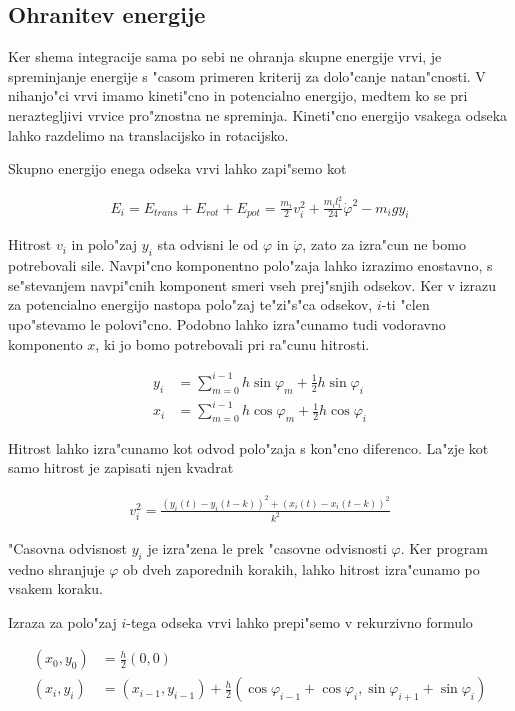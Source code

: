 \documentclass[a4paper,10pt]{article}
\renewcommand{\phi}{\varphi}
\begin{document}
\subsection{Ohranitev energije}

Ker shema integracije sama po sebi ne ohranja skupne energije vrvi, je spreminjanje energije s "casom primeren kriterij za dolo"canje natan"cnosti. V nihanjo"ci vrvi imamo kineti"cno in potencialno energijo, medtem ko se pri neraztegljivi vrvice pro"znostna ne spreminja. Kineti"cno energijo vsakega odseka lahko razdelimo na translacijsko in rotacijsko. 

Skupno energijo enega odseka vrvi lahko zapi"semo kot

\begin{align}
 E_i = E_{trans} + E_{rot} + E_{pot} = \frac{m_i}{2} v_i^2 + \frac{m_i l_i^2}{24} \dot{\phi}^2- m_i g y_i
\end{align}

Hitrost $v_i$ in polo"zaj $y_i$ sta odvisni le od $\phi$ in $\dot\phi$, zato za izra"cun ne bomo potrebovali sile. Navpi"cno komponentno polo"zaja lahko izrazimo enostavno, s se"stevanjem navpi"cnih komponent smeri vseh prej"snjih odsekov. Ker v izrazu za potencialno energijo nastopa polo"zaj te"zi"s"ca odsekov, $i$-ti "clen upo"stevamo le polovi"cno. Podobno lahko izra"cunamo tudi vodoravno komponento $x$, ki jo bomo potrebovali pri ra"cunu hitrosti. 

\begin{align}
 y_i &= \sum_{m=0}^{i-1} h \sin \phi_m + \frac{1}{2}h\sin\phi_i \\
 x_i &= \sum_{m=0}^{i-1} h \cos \phi_m + \frac{1}{2}h\cos\phi_i
\end{align}

Hitrost lahko izra"cunamo kot odvod polo"zaja s kon"cno diferenco. La"zje kot samo hitrost je zapisati njen kvadrat

\begin{align}
 v_i^2 = \frac{\left(y_i(t) - y_i(t-k)\right)^2 + \left(x_i(t) - x_i(t-k)\right)^2}{k^2}
\end{align}

"Casovna odvisnost $y_i$ je izra"zena le prek "casovne odvisnosti $\phi$. Ker program vedno shranjuje $\phi$ ob dveh zaporednih korakih, lahko hitrost izra"cunamo po vsakem koraku. 

Izraza za polo"zaj $i$-tega odseka vrvi lahko prepi"semo v rekurzivno formulo

\begin{align}
 (x_0, y_0) &= \frac{h}{2}(0, 0) \\
 (x_i, y_i) &= (x_{i-1}, y_{i-1}) + \frac{h}{2} (\cos\phi_{i-1} + \cos\phi_i, \sin\phi_{i+1} + \sin\phi_i)
\end{align}
\end{document}
